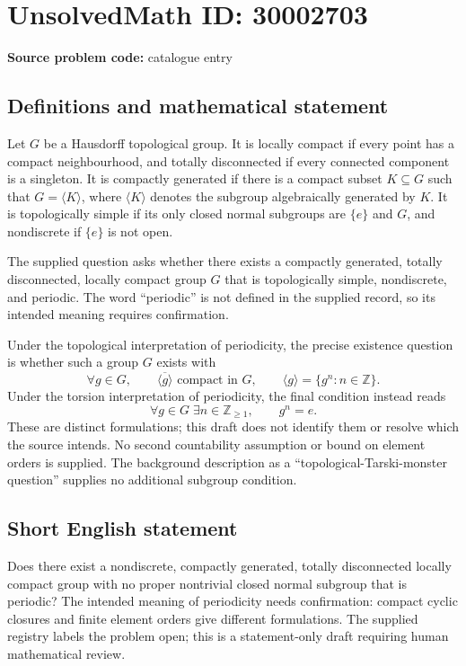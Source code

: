 \documentclass[11pt]{article}
\newcommand{\Z}{\mathbb{Z}}
\begin{document}
\section*{UnsolvedMath ID: 30002703}
\textbf{Source problem code:} catalogue entry
\subsection{Definitions and mathematical statement}
Let \(G\) be a Hausdorff topological group. It is locally compact if every point has a compact neighbourhood, and totally disconnected if every connected component is a singleton. It is compactly generated if there is a compact subset \(K\subseteq G\) such that \(G=\langle K\rangle\), where \(\langle K\rangle\) denotes the subgroup algebraically generated by \(K\). It is topologically simple if its only closed normal subgroups are \(\{e\}\) and \(G\), and nondiscrete if \(\{e\}\) is not open.

The supplied question asks whether there exists a compactly generated, totally disconnected, locally compact group \(G\) that is topologically simple, nondiscrete, and periodic. The word ``periodic'' is not defined in the supplied record, so its intended meaning requires confirmation.

Under the topological interpretation of periodicity, the precise existence question is whether such a group \(G\) exists with
\[
\forall g\in G,\qquad \overline{\langle g\rangle}\text{ compact in }G,
\qquad \langle g\rangle=\{g^n:n\in\Z\}.
\]
Under the torsion interpretation of periodicity, the final condition instead reads
\[
\forall g\in G\;\exists n\in\Z_{\geq 1},\qquad g^n=e.
\]
These are distinct formulations; this draft does not identify them or resolve which the source intends. No second countability assumption or bound on element orders is supplied. The background description as a ``topological-Tarski-monster question'' supplies no additional subgroup condition.
\subsection{Short English statement}
Does there exist a nondiscrete, compactly generated, totally disconnected locally compact group with no proper nontrivial closed normal subgroup that is periodic? The intended meaning of periodicity needs confirmation: compact cyclic closures and finite element orders give different formulations. The supplied registry labels the problem open; this is a statement-only draft requiring human mathematical review.
\end{document}
